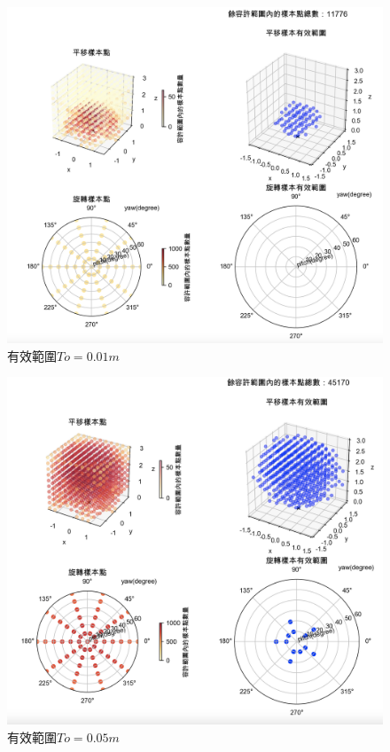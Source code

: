 \begin{figure}[htpb]
    \centering
    \includegraphics[width=15cm]{ch4pic/to001.png}
    \caption{有效範圍$To=0.01m$}
    \label{pic:to001}
\end{figure}

\begin{figure}[htpb]
    \centering
    \includegraphics[width=15cm]{ch4pic/to005.png}
    \caption{有效範圍$To=0.05m$}
    \label{pic:to005}
\end{figure}

